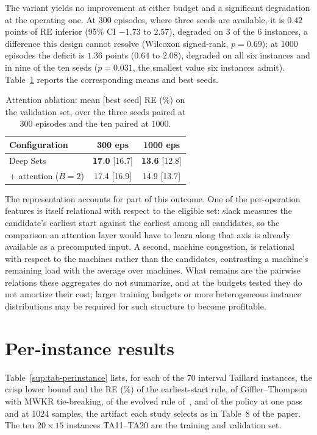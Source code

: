 \documentclass[preprint,12pt]{elsarticle}
\begin{document}
The variant yields no improvement at either budget and a significant
degradation at the operating one. At $300$ episodes, where three
seeds are available, it is $0.42$ points of RE inferior (95\% CI
$-1.73$ to $2.57$), degraded on 3 of the 6 instances, a difference
this design cannot resolve (Wilcoxon signed-rank, $p=0.69$); at
$1000$ episodes the deficit is $1.36$ points ($0.64$ to $2.08$),
degraded on all six instances and in nine of the ten seeds
($p=0.031$, the smallest value six instances admit).
Table~\ref{sup:tab-attn} reports the corresponding means and best
seeds.

\begin{table}[!htb]
\centering\small
\caption{Attention ablation: mean [best seed] RE (\%) on the
validation set, over the three seeds paired at $300$ episodes and the
ten paired at $1000$.}
\label{sup:tab-attn}
\begin{tabular}{lcc}
\toprule
Configuration & 300 eps & 1000 eps \\
\midrule
Deep Sets & \textbf{17.0} [16.7] & \textbf{13.6} [12.8] \\
+ attention ($B{=}2$) & 17.4 [16.9] & 14.9 [13.7] \\
\bottomrule
\end{tabular}
\end{table}

The representation accounts for part of this outcome. One of the
per-operation features is itself relational with respect to the
eligible set: slack measures the candidate's earliest start against
the earliest among all candidates, so the comparison an attention
layer would have to learn along that axis is already available as a
precomputed input. A second, machine congestion, is relational with
respect to the machines rather than the candidates, contrasting a
machine's remaining load with the average over machines. What remains
are the pairwise relations these aggregates do not summarize, and at
the budgets tested they do not amortize their cost; larger training
budgets or more heterogeneous instance distributions may be required
for such structure to become profitable.

\section{Per-instance results}
\label{sup:perinstance}

Table~\ref{sup:tab-perinstance} lists, for each of the 70 interval
Taillard instances, the crisp lower bound and the RE (\%) of the
earliest-start rule, of Giffler--Thompson with MWKR tie-breaking, of
the evolved rule of~\citet{DiazGP2026}, and of the policy at one pass
and at 1024 samples, the artifact each study selects as in Table~8 of
the paper. The ten $20{\times}15$ instances TA11--TA20 are the
training and validation set.
\end{document}

